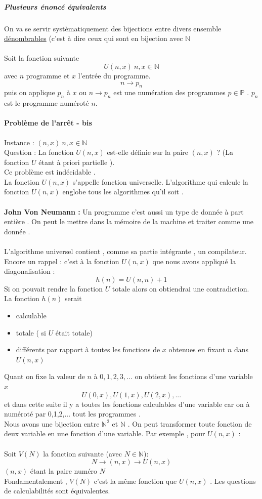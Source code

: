 \documentclass[base.tex]{subfiles}
\begin{document}
\subparagraph{Plusieurs énoncé équivalents}
On va se servir systèmatiquement des bijections entre divers ensemble \underline{dénombrables} (c'est à dire ceux qui sont en bijection avec $\mathbb{N}$ \\
\\
Soit la fonction suivante
\[U(n,x) \: n,x \in \mathbb{N}\]
avec $n$ programme et $x$ l'entrée du programme.
\[n \rightarrow p_n \]
puis on applique $p_n$ à $x$ ou $n \rightarrow p_n$ est une numération des programmes $p\in\mathbb{P}$ . $p_n$ est le programme numéroté $n$.

\paragraph{Problème de l'arrêt - bis }
Instance : $(n,x) \: n,x \in \mathbb{N}$\\
Question : La fonction $U(n,x)$ est-elle définie sur la paire $(n,x)$ ? (La fonction $U$ étant à priori partielle ).\\
Ce problème est indécidable .\\
La fonction $U(n,x)$ s'appelle fonction universelle. L'algorithme qui calcule la fonction $U(n,x)$ englobe tous les algorithmes qu'il soit .\\
\\
\textbf{John Von Neumann :} Un programme c'est aussi un type de donnée à part entière . On peut le mettre dans la mémoire de la machine et traiter comme une donnée .\\
\\
L'algorithme universel contient , comme sa partie intégrante , un compilateur. Encore un rappel : c'est à la fonction $U(n,x)$ que nous avons appliqué la diagonalisation :
\[h(n)=U(n,n)+1\]
Si on pouvait rendre la fonction $U$ totale alors on obtiendrai une contradiction. La fonction $h(n)$ serait
\begin{itemize}
\item calculable
\item totale ( si $U$ était totale)
\item différents par rapport à toutes les fonctions de $x$ obtenues en fixant $n$ dans $U(n,x)$
  
  \end{itemize}
Quant on fixe la valeur de $n$ à $0,1,2,3,...$ on obtient les fonctions d'une variable $x$
\[U(0,x),U(1,x),U(2,x),...\]
et dans cette suite il y a toutes les fonctions calculables d'une variable car on à numéroté par 0,1,2,... tout les programmes .\\
Nous avons une bijection entre $\mathbb{N}^2$ et $\mathbb{N}$ . On peut transformer toute fonction de deux variable en une fonction d'une variable. Par exemple , pour $U(n,x)$ : \\
\\
Soit $V(N)$ la fonction suivante (avec $N\in \mathbb{N}$):
\[N\rightarrow (n,x)\rightarrow U(n,x)\]
$(n,x)$ étant la paire numéro $N$\\
Fondamentalement , $V(N)$ c'est la même fonction que $U(n,x)$ . Les questions de calculabilités sont équivalentes.
\end{document}
